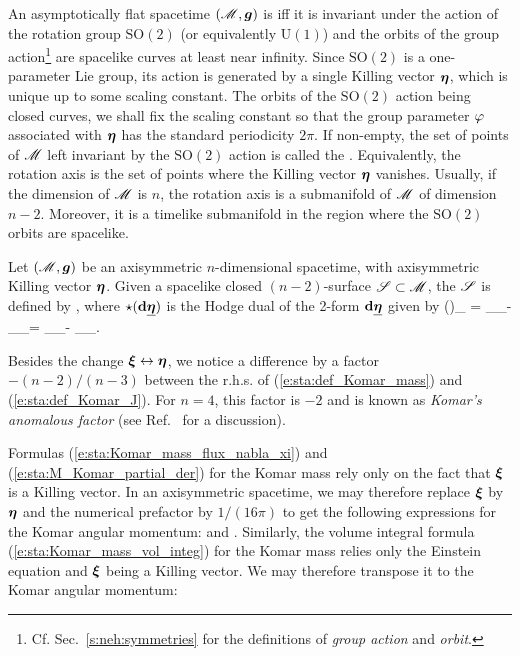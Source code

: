 An asymptotically flat spacetime $(\mathscr{M}, \bm{g})$ is  iff it is invariant
under the action of the rotation group $\mathrm{SO}(2)$ (or equivalently $\mathrm{U}(1)$)
and the orbits of the group action\footnote{Cf. Sec.~\ref{s:neh:symmetries} for the definitions of \emph{group action} and \emph{orbit}.} are spacelike curves at least near infinity.
Since $\mathrm{SO}(2)$ is a one-parameter Lie group, its action is generated by a single Killing vector $\bm{\eta}$,
which is unique up to some scaling constant.
The orbits of the $\mathrm{SO}(2)$ action being closed curves, we shall fix the scaling constant
so that the group parameter $\varphi$ associated with $\bm{\eta}$ has the standard periodicity $2\pi$.
If non-empty, the set of points of $\mathscr{M}$ left invariant by the $\mathrm{SO}(2)$ action is called the
. Equivalently, the rotation axis is the set of points
where the Killing vector $\bm{\eta}$ vanishes. Usually, if the dimension of $\mathscr{M}$ is $n$, the rotation
axis is a submanifold of $\mathscr{M}$ of dimension $n-2$. Moreover, it is a timelike submanifold in the region
where the $\mathrm{SO}(2)$ orbits are spacelike.


Let $(\mathscr{M}, \bm{g})$ be an axisymmetric $n$-dimensional spacetime,
with axisymmetric Killing vector $\bm{\eta}$.
Given a spacelike closed $(n-2)$-surface $\mathscr{S}\subset\mathscr{M}$,
the  $\mathscr{S}$ is
defined by
\be \label{e:sta:def_Komar_J}
     ,
\ee
where $\star(\mathbf{d} \underline{\bm{\eta}})$
is the Hodge dual of the 2-form $\mathbf{d} \underline{\bm{\eta}}$ given by
\be
    (\dd \uu{\eta})_{\alpha\beta} =
        \partial_\alpha \eta_\beta - \partial_\beta \eta_\alpha =
        \nabla_\alpha \eta_\beta - \nabla_\beta \eta_\alpha .
\ee

\begin{remark}
Besides the change $\bm{\xi}\leftrightarrow\bm{\eta}$, we notice a difference by a factor $-(n-2)/(n-3)$ between the r.h.s. of (\ref{e:sta:def_Komar_mass}) and (\ref{e:sta:def_Komar_J}). For $n=4$, this factor is $-2$ and is
known as \emph{Komar's anomalous factor} (see Ref.~\cite{Katz85} for a discussion).
\end{remark}

Formulas (\ref{e:sta:Komar_mass_flux_nabla_xi}) and (\ref{e:sta:M_Komar_partial_der})
for the Komar mass rely only on the fact that $\bm{\xi}$ is a Killing vector.
In an axisymmetric spacetime, we may therefore replace $\bm{\xi}$ by $\bm{\eta}$
and the numerical prefactor by $1/(16\pi)$ to get the following expressions
for the Komar angular momentum:
\be
\ee
and
\be \label{e:sta:J_Komar_partial_der}
     .
\ee
Similarly, the volume integral formula (\ref{e:sta:Komar_mass_vol_integ}) for the
Komar mass relies only the Einstein equation and $\bm{\xi}$ being a Killing vector.
We may therefore transpose it to the Komar angular momentum:

